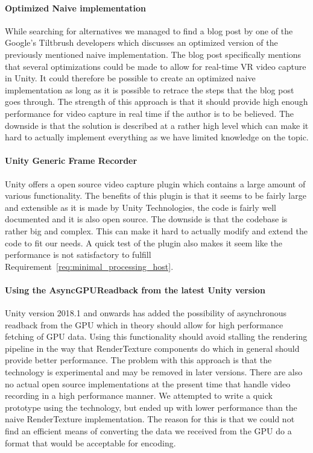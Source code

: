 \paragraph{Optimized Naive implementation}
While searching for alternatives we managed to find a blog post\cite{google_vrCaptureBlog} by one of the Google's Tiltbrush developers which discusses an optimized version of the previously mentioned naive implementation. The blog post specifically mentions that several optimizations could be made to allow for real-time VR video capture in Unity. It could therefore be possible to create an optimized naive implementation as long as it is possible to retrace the steps that the blog post goes through. The strength of this approach is that it should provide high enough performance for video capture in real time if the author is to be believed. The downside is that the solution is described at a rather high level which can make it hard to actually implement everything as we have limited knowledge on the topic. 

\paragraph{Unity Generic Frame Recorder}
Unity offers a open source video capture plugin\cite{unity_genericFrameRecprder} which contains a large amount of various functionality. The benefits of this plugin is that it seems to be fairly large and extensible as it is made by Unity Technologies, the code is fairly well documented and it is also open source. The downside is that the codebase is rather big and complex. This can make it hard to actually modify and extend the code to fit our needs. A quick test of the plugin also makes it seem like the performance is not satisfactory to fulfill Requirement~\ref{req:minimal_processing_host}.

\paragraph{Using the AsyncGPUReadback from the latest Unity version}
Unity version 2018.1 and onwards has added the possibility of asynchronous readback from the GPU\cite{unity_asyncReadback} which in theory should allow for high performance fetching of GPU data. Using this functionality should avoid stalling the rendering pipeline in the way that RenderTexture components do which in general should provide better performance. The problem with this approach is that the technology is experimental and may be removed in later versions. There are also no actual open source implementations at the present time that handle video recording in a high performance manner. We attempted to write a quick prototype using the technology, but ended up with lower performance than the naive RenderTexture implementation. The reason for this is that we could not find an efficient means of converting the data we received from the GPU do a format that would be acceptable for encoding. 

